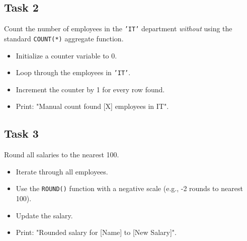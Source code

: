 \documentclass[12pt,a4paper]{article}
\newif\ifshowsolutions
\begin{document}
\subsection*{Task 2}
Count the number of employees in the \texttt{'IT'} department \textit{without} using the standard \texttt{COUNT(*)} aggregate function.
\begin{itemize}
    \item Initialize a counter variable to 0.
    \item Loop through the employees in \texttt{'IT'}.
    \item Increment the counter by 1 for every row found.
    \item Print: "Manual count found [X] employees in IT".
\end{itemize}

\ifshowsolutions
\textbf{Solution:}
\begin{lstlisting}[language=SQL]
DO $$ 
DECLARE
    r RECORD;
    v_count INT := 0;
BEGIN
    FOR r IN SELECT * FROM employees WHERE department = 'IT' LOOP
        v_count := v_count + 1;
    END LOOP;
    
    RAISE NOTICE 'Manual count found % employees in IT', v_count;
END $$;
\end{lstlisting}
\fi

\subsection*{Task 3}
Round all salaries to the nearest 100.
\begin{itemize}
    \item Iterate through all employees.
    \item Use the \texttt{ROUND()} function with a negative scale (e.g., -2 rounds to nearest 100).
    \item Update the salary.
    \item Print: "Rounded salary for [Name] to [New Salary]".
\end{itemize}

\ifshowsolutions
\textbf{Solution:}
\begin{lstlisting}[language=SQL]
DO $$ 
DECLARE
    r RECORD;
    v_new_salary NUMERIC;
BEGIN
    FOR r IN SELECT employee_id, first_name, salary FROM employees LOOP
        
        -- Round to nearest 100 (e.g., 4560 -> 4600)
        v_new_salary := ROUND(r.salary, -2);
        
        UPDATE employees 
        SET salary = v_new_salary 
        WHERE employee_id = r.employee_id;

        RAISE NOTICE 'Rounded salary for % to %', r.first_name, v_new_salary;
    END LOOP;
END $$;
\end{lstlisting}
\fi
\end{document}
